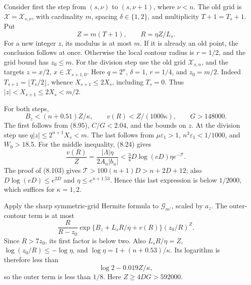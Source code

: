 \documentclass[
  11pt,
  a4paper,
]{article}
\begin{document}
Consider first the step from \((s,\nu)\) to \((s,\nu+1)\), where
\(\nu<n\). The old grid is \(\mathcal X=\mathcal X_{s,\nu}\), with
cardinality \(m\), spacing \(\delta\in\{1,2\}\), and multiplicity
\(T+1=T_s+1\). Put \[
Z=m(T+1),\qquad R=\eta Z/L_s.
\] For a new integer \(z\), its modulus is at most \(m\). If it is
already an old point, the conclusion follows at once. Otherwise the
local contour radius is \(r=1/2\), and the grid bound has \(z_0\le m\).
For the division step use the old grid \(\mathcal X_{s,n}\), and the
targets \(z=x/2\), \(x\in\mathcal X_{s+1,0}\). Here \(q=2^n\),
\(\delta=1\), \(r=1/4\), and \(z_0=m/2\). Indeed
\(T_{s+1}=\lfloor T_s/2\rfloor\), whence \(X_{s+1}\le2X_s\), including
\(T_s=0\). Thus \(|z|<X_{s+1}\le2X_s<m/2\).

For both steps, \[
B_z<(n+0.51)Z/\kappa,\qquad
v(R)<Z/(1000\kappa),\qquad
G>148000.
\] The first follows from (8.95), \(C/G<2.04\), and the bounds on \(z\).
At the division step use \(q|z|\le2^{n+1}X_s<m\). The last follows from
\(\mu\varepsilon_1>1\), \(n^3\varepsilon_1<1/1000\), and \(W_0>18.5\).
For the middle inequality, (8.24) gives \[
\frac{v(R)}Z
=\frac{|\Lambda|\eta}{2A_n|b_n|}
<\tfrac34D\log(eD)\eta e^{-\mathcal T}.
\] The proof of (8.103) gives \(\mathcal T>100(n+1)D>n+2D+12\); also
\(D\log(eD)\le e^{2D}\) and \(\eta\le e^{n+1.53}\). Hence this last
expression is below \(1/2000\), which suffices for \(\kappa=1,2\).

Apply the sharp symmetric-grid Hermite formula to \(\mathcal G_{m'}\),
scaled by \(a_z\). The outer-contour term is at most \[
\frac R{R-z_0}
\exp\{B_z+L_sR/\eta+v(R)\}(z_0/R)^Z.
\] Since \(R>7z_0\), its first factor is below two. Also
\(L_sR/\eta=Z\), \(\log(z_0/R)\le-\log\eta\), and
\(\log\eta=1+(n+0.53)/\kappa\). Its logarithm is therefore less than \[
\log2-0.019Z/\kappa,
\] so the outer term is less than \(1/8\). Here \(Z\ge4DG>592000\).
\end{document}
